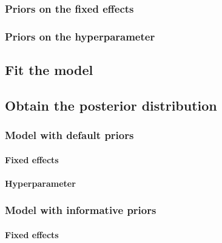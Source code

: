 \documentclass[
]{book}
\begin{document}
\hypertarget{priors-on-the-fixed-effects}{%
\subsubsection{Priors on the fixed
effects}\label{priors-on-the-fixed-effects}}

\hypertarget{priors-on-the-hyperparameter}{%
\subsubsection{Priors on the
hyperparameter}\label{priors-on-the-hyperparameter}}

\hypertarget{fit-the-model}{%
\subsection{Fit the model}\label{fit-the-model}}

\hypertarget{obtain-the-posterior-distribution}{%
\subsection{Obtain the posterior
distribution}\label{obtain-the-posterior-distribution}}

\hypertarget{model-with-default-priors}{%
\subsubsection{Model with default
priors}\label{model-with-default-priors}}

\hypertarget{fixed-effects}{%
\paragraph{Fixed effects}\label{fixed-effects}}

\hypertarget{hyperparameter}{%
\paragraph{Hyperparameter}\label{hyperparameter}}

\hypertarget{model-with-informative-priors}{%
\subsubsection{Model with informative
priors}\label{model-with-informative-priors}}

\hypertarget{fixed-effects-1}{%
\paragraph{Fixed effects}\label{fixed-effects-1}}
\end{document}
